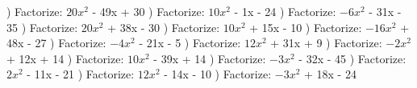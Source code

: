 \documentclass{article}%
\begin{document}
\newline%
) Factorize: $20x^2$ - 49x + 30%
\newline%
\newline%
) Factorize: $10x^2$ - 1x - 24%
\newline%
\newline%
) Factorize: $-6x^2$ - 31x - 35%
\newline%
\newline%
) Factorize: $20x^2$ + 38x - 30%
\newline%
\newline%
) Factorize: $10x^2$ + 15x - 10%
\newline%
\newline%
) Factorize: $-16x^2$ + 48x - 27%
\newline%
\newline%
) Factorize: $-4x^2$ - 21x - 5%
\newline%
\newline%
) Factorize: $12x^2$ + 31x + 9%
\newline%
\newline%
) Factorize: $-2x^2$ + 12x + 14%
\newline%
\newline%
) Factorize: $10x^2$ - 39x + 14%
\newline%
\newline%
) Factorize: $-3x^2$ - 32x - 45%
\newline%
\newline%
) Factorize: $2x^2$ - 11x - 21%
\newline%
\newline%
) Factorize: $12x^2$ - 14x - 10%
\newline%
\newline%
) Factorize: $-3x^2$ + 18x - 24%
\newline%
\newline%
\end{document}
